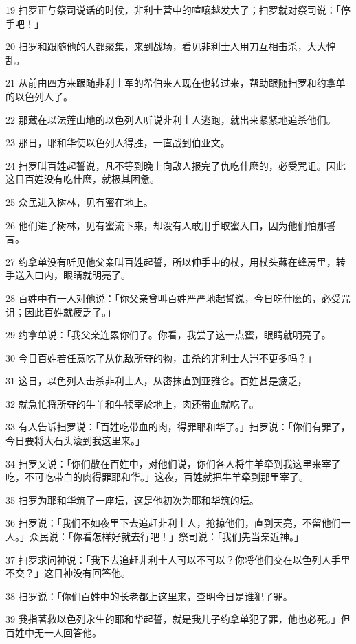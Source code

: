 \par 19 扫罗正与祭司说话的时候，非利士营中的喧嚷越发大了；扫罗就对祭司说：「停手吧！」
\par 20 扫罗和跟随他的人都聚集，来到战场，看见非利士人用刀互相击杀，大大惶乱。
\par 21 从前由四方来跟随非利士军的希伯来人现在也转过来，帮助跟随扫罗和约拿单的以色列人了。
\par 22 那藏在以法莲山地的以色列人听说非利士人逃跑，就出来紧紧地追杀他们。
\par 23 那日，耶和华使以色列人得胜，一直战到伯亚文。
\par 24 扫罗叫百姓起誓说，凡不等到晚上向敌人报完了仇吃什麽的，必受咒诅。因此这日百姓没有吃什麽，就极其困惫。
\par 25 众民进入树林，见有蜜在地上。
\par 26 他们进了树林，见有蜜流下来，却没有人敢用手取蜜入口，因为他们怕那誓言。
\par 27 约拿单没有听见他父亲叫百姓起誓，所以伸手中的杖，用杖头蘸在蜂房里，转手送入口内，眼睛就明亮了。
\par 28 百姓中有一人对他说：「你父亲曾叫百姓严严地起誓说，今日吃什麽的，必受咒诅；因此百姓就疲乏了。」
\par 29 约拿单说：「我父亲连累你们了。你看，我尝了这一点蜜，眼睛就明亮了。
\par 30 今日百姓若任意吃了从仇敌所夺的物，击杀的非利士人岂不更多吗？」
\par 31 这日，以色列人击杀非利士人，从密抹直到亚雅仑。百姓甚是疲乏，
\par 32 就急忙将所夺的牛羊和牛犊宰於地上，肉还带血就吃了。
\par 33 有人告诉扫罗说：「百姓吃带血的肉，得罪耶和华了。」扫罗说：「你们有罪了，今日要将大石头滚到我这里来。」
\par 34 扫罗又说：「你们散在百姓中，对他们说，你们各人将牛羊牵到我这里来宰了吃，不可吃带血的肉得罪耶和华。」这夜，百姓就把牛羊牵到那里宰了。
\par 35 扫罗为耶和华筑了一座坛，这是他初次为耶和华筑的坛。
\par 36 扫罗说：「我们不如夜里下去追赶非利士人，抢掠他们，直到天亮，不留他们一人。」众民说：「你看怎样好就去行吧！」祭司说：「我们先当亲近神。」
\par 37 扫罗求问神说：「我下去追赶非利士人可以不可以？你将他们交在以色列人手里不交？」这日神没有回答他。
\par 38 扫罗说：「你们百姓中的长老都上这里来，查明今日是谁犯了罪。
\par 39 我指著救以色列永生的耶和华起誓，就是我儿子约拿单犯了罪，他也必死。」但百姓中无一人回答他。
